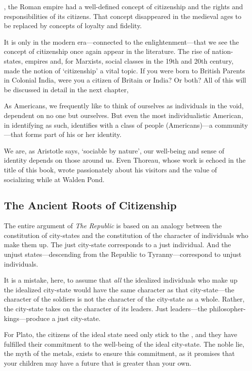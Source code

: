 , the Roman empire had a well-defined concept of citizenship and the rights and responsibilities of its citizens. That concept disappeared in the medieval ages to be replaced by concepts of loyalty and fidelity. 

It is only in the modern era---connected to the enlightenment---that we see the concept of citizenship once again appear in the literature. The rise of nation-states, empires and, for Marxists, social classes in the 19th and 20th century, made the notion of `citizenship' a vital topic. If you were born to British Parents in Colonial India, were you a citizen of Britain or India? Or both? All of this will be discussed in detail in the next chapter, 

As Americans, we frequently like to think of ourselves as individuals in the void, dependent on no one but ourselves. But even the most individualistic American, in identifying as such, identifies with a class of people (Americans)---a community---that forms part of his or her identity. 

We are, as Aristotle says, `sociable by nature', our well-being and sense of identity depends on those around us. Even Thoreau, whose work is echoed in the title of this book, wrote passionately about his visitors and the value of socializing while at Walden Pond.

\subsection{The Ancient Roots of Citizenship}
\label{theancientrootsofcitizenship}

The entire argument of \emph{The Republic} is based on an analogy between the constitution of city-states and the constitution of the character of individuals who make them up. The just city-state corresponds to a just individual. And the unjust states---descending from the Republic to Tyranny---correspond to unjust individuals. 

It is a mistake, here, to assume that \emph{all} the idealized individuals who make up the idealized city-state would have the same character as that city-state---the character of the soldiers is not the character of the city-state as a whole. Rather, the city-state takes on the character of its leaders. Just leaders---the philosopher-kings---produce a just city-state. 

For Plato, the citizens of the ideal state need only stick to the , and they have fulfilled their commitment to the well-being of the ideal city-state. The noble lie, the myth of the metals, exists to ensure this commitment, as it promises that your children may have a future that is greater than your own.

